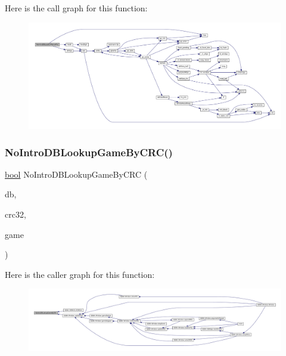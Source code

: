 Here is the call graph for this function\+:
\nopagebreak
\begin{figure}[H]
\begin{center}
\leavevmode
\includegraphics[width=350pt]{no-intro_8c_a0ce34503c62adbfd6accf09a9ce89260_cgraph}
\end{center}
\end{figure}
\mbox{\label{no-intro_8c_a8aa1074ddc85b995d2949c72e356f0d1}} 
\subsubsection{\texorpdfstring{No\+Intro\+D\+B\+Lookup\+Game\+By\+C\+R\+C()}{NoIntroDBLookupGameByCRC()}}
{\footnotesize\ttfamily \mbox{\hyperlink{libretro_8h_a4a26dcae73fb7e1528214a068aca317e}{bool}} No\+Intro\+D\+B\+Lookup\+Game\+By\+C\+RC (\begin{DoxyParamCaption}\item[{const struct No\+Intro\+DB $\ast$}]{db,  }\item[{uint32\+\_\+t}]{crc32,  }\item[{struct \mbox{\hyperlink{no-intro_8h_struct_no_intro_game}{No\+Intro\+Game}} $\ast$}]{game }\end{DoxyParamCaption})}

Here is the caller graph for this function\+:
\nopagebreak
\begin{figure}[H]
\begin{center}
\leavevmode
\includegraphics[width=350pt]{no-intro_8c_a8aa1074ddc85b995d2949c72e356f0d1_icgraph}
\end{center}
\end{figure}
